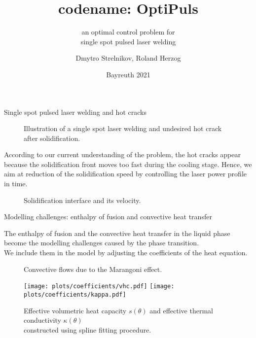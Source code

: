 \documentclass[
	9pt,
	hyperref = {unicode,pdfpagelabels=false},
	notheorems,
	aspectratio=169
	]{beamer}
\title{codename: OptiPuls}
\subtitle{an optimal control problem for\\single spot pulsed laser welding}
\author{Dmytro Strelnikov, Roland Herzog}
\institute{Technische Universität Chemnitz \\ Technische Universität Ilmenau}
\date{Bayreuth 2021}
\begin{document}
\maketitle

\begin{frame}{Single spot pulsed laser welding and hot cracks}
\begin{figure}
		\centering
	\begin{subfigure}[b]{.5\textwidth}
		\centering
		
	\end{subfigure}%
	\begin{subfigure}[b]{.5\textwidth}
		\centering
		
	\end{subfigure}
	\caption{Illustration of a single spot laser welding and undesired hot crack after solidification.}
	\label{fig:welding}
	\end{figure}

	According to our current understanding of the problem, the hot cracks appear because the solidification front moves too fast during the cooling stage.
	Hence, we aim at reduction of the solidification speed by controlling the laser power profile in time.

	\begin{figure}
		\centering
		
		\caption{Solidification interface and its velocity.}
	\end{figure}
\end{frame}


\begin{frame}{Modelling challenges: enthalpy of fusion and convective heat transfer}
	\begin{minipage}{0.5\textwidth}
		The enthalpy of fusion and the convective heat transfer in the liquid phase become the modelling challenges caused by the phase transition.\\
		We include them in the model by adjusting the coefficients of the heat equation.
	\end{minipage}%
	\begin{minipage}{0.5\textwidth}
		\begin{figure}
			\centering
			
			\caption{Convective flows due to the Marangoni effect.}
			\label{fig:convection}
		\end{figure}
	\end{minipage}
	\vspace{-1.5em}
	\begin{figure}
		\centering
		\texttt{[image: plots/coefficients/vhc.pdf]}%
		\texttt{[image: plots/coefficients/kappa.pdf]}
		\vspace{-1.2em}
		\caption{Effective volumetric heat capacity $s(\theta)$ and effective thermal conductivity $\kappa(\theta)$\\ constructed using spline fitting procedure.}
		\label{fig:heat_capacity}
	\end{figure}
\end{frame}
\end{document}
